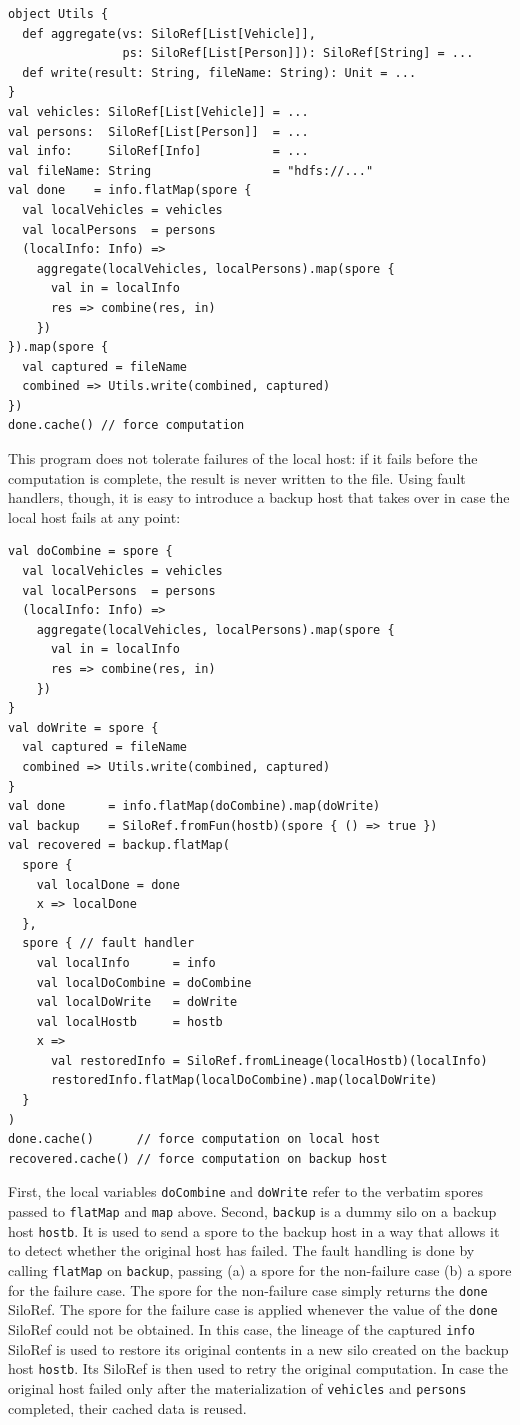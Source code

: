 \documentclass[preprint]{sigplanconf}
\theoremstyle{definition}
\theoremstyle{definition}
\begin{document}
\begin{lstlisting}
object Utils {
  def aggregate(vs: SiloRef[List[Vehicle]],
                ps: SiloRef[List[Person]]): SiloRef[String] = ...
  def write(result: String, fileName: String): Unit = ...
}
val vehicles: SiloRef[List[Vehicle]] = ...
val persons:  SiloRef[List[Person]]  = ...
val info:     SiloRef[Info]          = ...
val fileName: String                 = "hdfs://..."
val done    = info.flatMap(spore {
  val localVehicles = vehicles
  val localPersons  = persons
  (localInfo: Info) =>
    aggregate(localVehicles, localPersons).map(spore {
      val in = localInfo
      res => combine(res, in)
    })
}).map(spore {
  val captured = fileName
  combined => Utils.write(combined, captured)
})
done.cache() // force computation
\end{lstlisting}
\noindent
This program does not tolerate failures of the local host: if it fails before
the computation is complete, the result is never written to the file. Using
fault handlers, though, it is easy to introduce a backup host that takes over
in case the local host fails at any point:

\begin{lstlisting}
val doCombine = spore {
  val localVehicles = vehicles
  val localPersons  = persons
  (localInfo: Info) =>
    aggregate(localVehicles, localPersons).map(spore {
      val in = localInfo
      res => combine(res, in)
    })
}
val doWrite = spore {
  val captured = fileName
  combined => Utils.write(combined, captured)
}
val done      = info.flatMap(doCombine).map(doWrite)
val backup    = SiloRef.fromFun(hostb)(spore { () => true })
val recovered = backup.flatMap(
  spore {
    val localDone = done
    x => localDone
  },
  spore { // fault handler
    val localInfo      = info
    val localDoCombine = doCombine
    val localDoWrite   = doWrite
    val localHostb     = hostb
    x =>
      val restoredInfo = SiloRef.fromLineage(localHostb)(localInfo)
      restoredInfo.flatMap(localDoCombine).map(localDoWrite)
  }
)
done.cache()      // force computation on local host
recovered.cache() // force computation on backup host
\end{lstlisting}
\noindent
First, the local variables \verb|doCombine| and \verb|doWrite| refer to the
verbatim spores passed to \verb|flatMap| and \verb|map| above. Second,
\verb|backup| is a dummy silo on a backup host \verb|hostb|. It is used to
send a spore to the backup host in a way that allows it to detect whether the
original host has failed. The fault handling is done by calling \verb|flatMap|
on \verb|backup|, passing (a) a spore for the non-failure case  (b) a spore
for the failure case. The spore for the non-failure case simply returns the
\verb|done| SiloRef. The spore for the failure case is applied whenever the
value of the \verb|done| SiloRef could not be obtained. In this case, the
lineage of the captured \verb|info| SiloRef is used to restore its original
contents in a new silo created on the backup host \verb|hostb|. Its SiloRef is
then used to retry the original computation. In case the original host failed
only after the materialization of \verb|vehicles| and \verb|persons|
completed, their cached data is reused.
\end{document}
